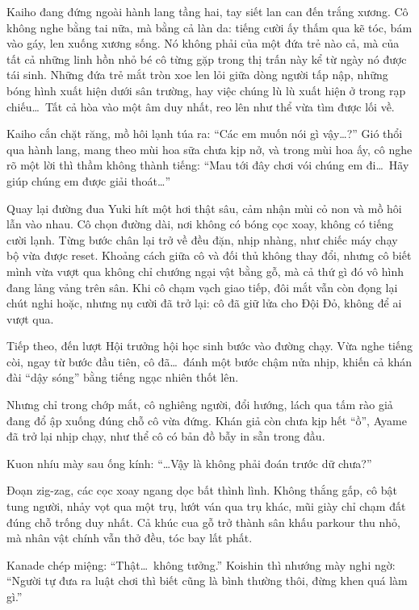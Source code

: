\documentclass[../main.tex]{subfiles}
\begin{document}
Kaiho đang đứng ngoài hành lang tầng hai, tay siết lan can đến trắng xương. Cô không nghe bằng tai nữa, mà bằng cả làn da: tiếng cười ấy thấm qua kẽ tóc, bám vào gáy, len xuống xương sống. Nó không phải của một đứa trẻ nào cả, mà của tất cả những linh hồn nhỏ bé cô từng gặp trong thị trấn này kể từ ngày nó được tái sinh. Những đứa trẻ mắt tròn xoe len lỏi giữa dòng người tấp nập, những bóng hình xuất hiện dưới sân trường, hay việc chúng lù lù xuất hiện ở trong rạp chiếu\dots\ Tất cả hòa vào một âm duy nhất, reo lên như thể vừa tìm được lối về.

Kaiho cắn chặt răng, mồ hôi lạnh túa ra: ``Các em muốn nói gì vậy\dots?'' Gió thổi qua hành lang, mang theo mùi hoa sữa chưa kịp nở, và trong mùi hoa ấy, cô nghe rõ một lời thì thầm không thành tiếng: ``Mau tới đây chơi vói chúng em đi\dots\ Hãy giúp chúng em được giải thoát\dots''

Quay lại đường đua Yuki hít một hơi thật sâu, cảm nhận mùi cỏ non và mồ hôi lẫn vào nhau. Cô chọn đường dài, nơi không có bóng cọc xoay, không có tiếng cười lạnh. Từng bước chân lại trở về đều đặn, nhịp nhàng, như chiếc máy chạy bộ vừa được reset. Khoảng cách giữa cô và đối thủ không thay đổi, nhưng cô biết mình vừa vượt qua không chỉ chướng ngại vật bằng gỗ, mà cả thứ gì đó vô hình đang lảng vảng trên sân. Khi cô chạm vạch giao tiếp, đôi mắt vẫn còn đọng lại chút nghi hoặc, nhưng nụ cười đã trở lại: cô đã giữ lửa cho Đội Đỏ, không để ai vượt qua.

Tiếp theo, đến lượt Hội trưởng hội học sinh bước vào đường chạy. Vừa nghe tiếng còi, ngay từ bước đầu tiên, cô đã\dots\ đánh một bước chậm nửa nhịp, khiến cả khán đài ``dậy sóng'' bằng tiếng ngạc nhiên thốt lên.

Nhưng chỉ trong chớp mắt, cô nghiêng người, đổi hướng, lách qua tấm rào giả đang đổ ập xuống đúng chỗ cô vừa đứng. Khán giả còn chưa kịp hết ``ồ'', Ayame đã trở lại nhịp chạy, như thể cô có bản đồ bẫy in sẵn trong đầu.

Kuon nhíu mày sau ống kính: ``\dots Vậy là không phải đoán trước dữ chưa?''

Đoạn zig-zag, các cọc xoay ngang dọc bất thình lình. Không thắng gấp, cô bật tung người, nhảy vọt qua một trụ, lướt ván qua trụ khác, mũi giày chỉ chạm đất đúng chỗ trống duy nhất. Cả khúc cua gỗ trở thành sân khấu parkour thu nhỏ, mà nhân vật chính vẫn thở đều, tóc bay lất phất.

Kanade chép miệng: ``Thật\dots\ không tưởng.'' Koishin thì nhướng mày nghi ngờ: ``Người tự đưa ra luật chơi thì biết cũng là bình thường thôi, đừng khen quá làm gì.''
\end{document}

